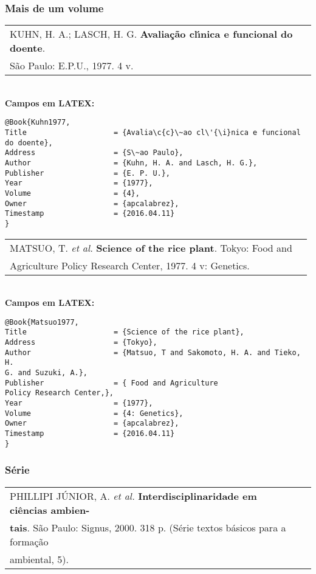 \subsubsection{Mais de um volume}

\begin{tabular}{|l|c|} \hline
	KUHN, H. A.; LASCH, H. G. \textbf{Avalia\c{c}\~ao cl\'{\i}nica e funcional do doente}. \\S\~ao Paulo:  E.P.U., 1977. 4 v.    \\\hline
\end{tabular}\\

\textbf{Campos em LATEX:}

\begin{verbatim}
@Book{Kuhn1977,
Title                    = {Avalia\c{c}\~ao cl\'{\i}nica e funcional do doente},
Address                  = {S\~ao Paulo},
Author                   = {Kuhn, H. A. and Lasch, H. G.},
Publisher                = {E. P. U.},
Year                     = {1977},
Volume                   = {4},
Owner                    = {apcalabrez},
Timestamp                = {2016.04.11}
}
\end{verbatim}

\begin{tabular}{|l|c|} \hline
	MATSUO, T. \textit{et al.}  \textbf{ Science of the rice plant}. Tokyo: Food and \\ Agriculture Policy Research Center, 1977. 4 v: Genetics. \\\hline
\end{tabular}\\

\textbf{Campos em LATEX:}

\begin{verbatim}
@Book{Matsuo1977,
Title                    = {Science of the rice plant},
Address                  = {Tokyo},
Author                   = {Matsuo, T and Sakomoto, H. A. and Tieko, H. 
G. and Suzuki, A.},
Publisher                = { Food and Agriculture
Policy Research Center,},
Year                     = {1977},
Volume                   = {4: Genetics},
Owner                    = {apcalabrez},
Timestamp                = {2016.04.11}
}
\end{verbatim}

\subsubsection{S\'erie}

\begin{tabular}{|l|c|} \hline
	PHILLIPI J\'UNIOR, A. \textit{et al.} \textbf{Interdisciplinaridade em ci\^encias ambien-}\\ 
	\textbf{tais}. S\~ao Paulo: Signus, 2000. 318 p. (S\'erie textos b\'asicos para a forma\c{c}\~ao \\ambiental, 5). \\\hline
\end{tabular}\\

